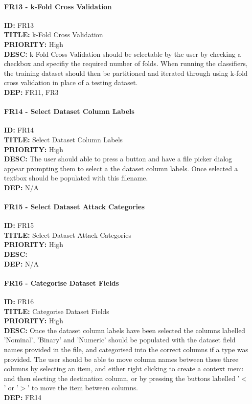 \paragraph*{FR13 - k-Fold Cross Validation}
\textbf{ID:} FR13 \\
\textbf{TITLE:} k-Fold Cross Validation \\
\textbf{PRIORITY:} High \\
\textbf{DESC:} k-Fold Cross Validation should be selectable by the user by checking a checkbox and specifiy the required number of folds. When running the classifiers, the training dataset should then be partitioned and iterated through using k-fold cross validation in place of a testing dataset.  \\
\textbf{DEP:} FR11, FR3
\paragraph*{FR14 - Select Dataset Column Labels}
\textbf{ID:} FR14 \\
\textbf{TITLE:} Select Dataset Column Labels \\
\textbf{PRIORITY:} High \\
\textbf{DESC:} The user should able to press a button and have a file picker dialog appear prompting them to select a the dataset column labels. Once selected a textbox should be populated with this filename.  \\
\textbf{DEP:} N/A
\paragraph*{FR15 - Select Dataset Attack Categories}
\textbf{ID:} FR15 \\
\textbf{TITLE:} Select Dataset Attack Categories \\
\textbf{PRIORITY:} High \\
\textbf{DESC:}   \\
\textbf{DEP:} N/A
\paragraph*{FR16 - Categorise Dataset Fields}
\textbf{ID:} FR16 \\
\textbf{TITLE:} Categorise Dataset Fields \\
\textbf{PRIORITY:} High \\
\textbf{DESC:} Once the dataset column labels have been selected the columns labelled 'Nominal', 'Binary' and 'Numeric' should be populated with the dataset field names provided in the file, and categorised into the correct columns if a type was provided. The user should be able to move column names between these three columns by selecting an item, and either right clicking to create a context menu and then electing the destination column, or by pressing the buttons labelled '$<$' or '$>$' to move the item between columns. \\
\textbf{DEP:} FR14
